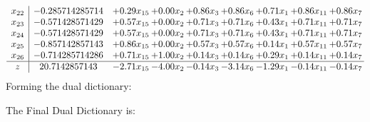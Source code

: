 \documentclass[8pt]{article}
\begin{document}
\[\begin{array}{c| c c@{\hskip 2pt} c@{\hskip 2pt} c@{\hskip 2pt} c@{\hskip 2pt} c@{\hskip 2pt} c@{\hskip 2pt} c@{\hskip 2pt} }
 x_{22}   &  -0.285714285714 & +  0.29 x_{15} & +  0.00 x_{2} & +  0.86 x_{3} & +  0.86 x_{6} & +  0.71 x_{1} & +  0.86 x_{11} & +  0.86 x_{7}\\
 x_{23}   &  -0.571428571429 & +  0.57 x_{15} & +  0.00 x_{2} & +  0.71 x_{3} & +  0.71 x_{6} & +  0.43 x_{1} & +  0.71 x_{11} & +  0.71 x_{7}\\
 x_{24}   &  -0.571428571429 & +  0.57 x_{15} & +  0.00 x_{2} & +  0.71 x_{3} & +  0.71 x_{6} & +  0.43 x_{1} & +  0.71 x_{11} & +  0.71 x_{7}\\
 x_{25}   &  -0.857142857143 & +  0.86 x_{15} & +  0.00 x_{2} & +  0.57 x_{3} & +  0.57 x_{6} & +  0.14 x_{1} & +  0.57 x_{11} & +  0.57 x_{7}\\
 x_{26}   &  -0.714285714286 & +  0.71 x_{15} & +  1.00 x_{2} & +  0.14 x_{3} & +  0.14 x_{6} & +  0.29 x_{1} & +  0.14 x_{11} & +  0.14 x_{7}\\
\hline
z    &  20.7142857143 & -2.71 x_{15} & -4.00 x_{2} & -0.14 x_{3} & -3.14 x_{6} & -1.29 x_{1} & -0.14 x_{11} & -0.14 x_{7}\\
\end{array}\]
Forming the dual dictionary:

The Final Dual Dictionary is: 
\end{document}
